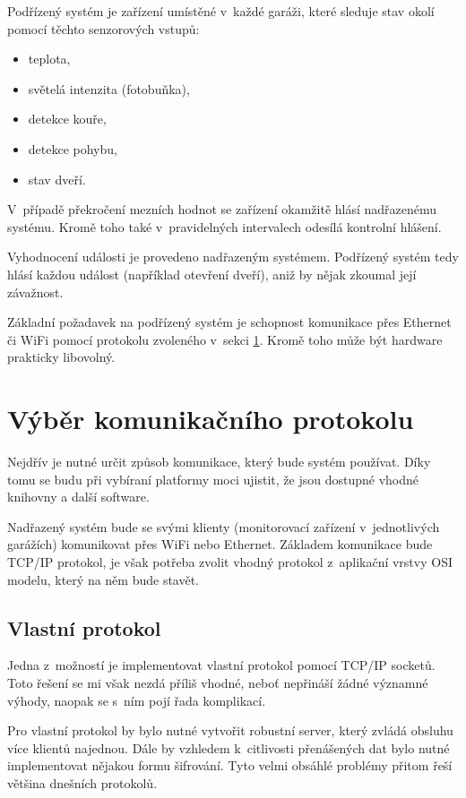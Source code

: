 Podřízený systém je zařízení umístěné v~každé garáži, které sleduje stav okolí pomocí těchto senzorových vstupů:

\begin{itemize}
    \item teplota,
    \item světelá intenzita (fotobuňka),
    \item detekce kouře,
    \item detekce pohybu,
    \item stav dveří.
\end{itemize}

V~případě překročení mezních hodnot se zařízení okamžitě hlásí nadřazenému systému. Kromě toho také v~pravidelných intervalech odesílá kontrolní hlášení. 

Vyhodnocení události je provedeno nadřazeným systémem. Podřízený systém tedy hlásí každou událost (například otevření dveří), aniž by nějak zkoumal její závažnost.

Základní požadavek na podřízený systém je schopnost komunikace přes Ethernet či WiFi pomocí protokolu zvoleného v~sekci \ref{sec:an_protocol}. Kromě toho může být hardware prakticky libovolný.

\section{Výběr komunikačního protokolu}
\label{sec:an_protocol}

Nejdřív je nutné určit způsob komunikace, který bude systém používat. Díky tomu se budu při vybíraní platformy moci ujistit, že jsou dostupné vhodné knihovny a další software. 

Nadřazený systém bude se svými klienty (monitorovací zařízení v~jednotlivých garážích) komunikovat přes WiFi nebo Ethernet. Základem komunikace bude TCP/IP protokol, je však potřeba zvolit vhodný protokol z~aplikační vrstvy OSI modelu, který na něm bude stavět.

\subsection{Vlastní protokol}

Jedna z~možností je implementovat vlastní protokol pomocí TCP/IP socketů. Toto řešení se mi však nezdá příliš vhodné, neboť nepřináší žádné významné výhody, naopak se s~ním pojí řada komplikací.

Pro vlastní protokol by bylo nutné vytvořit robustní server, který zvládá obsluhu více klientů najednou. Dále by vzhledem k~citlivosti přenášených dat bylo nutné implementovat nějakou formu šifrování. Tyto velmi obsáhlé problémy přitom řeší většina dnešních protokolů.

